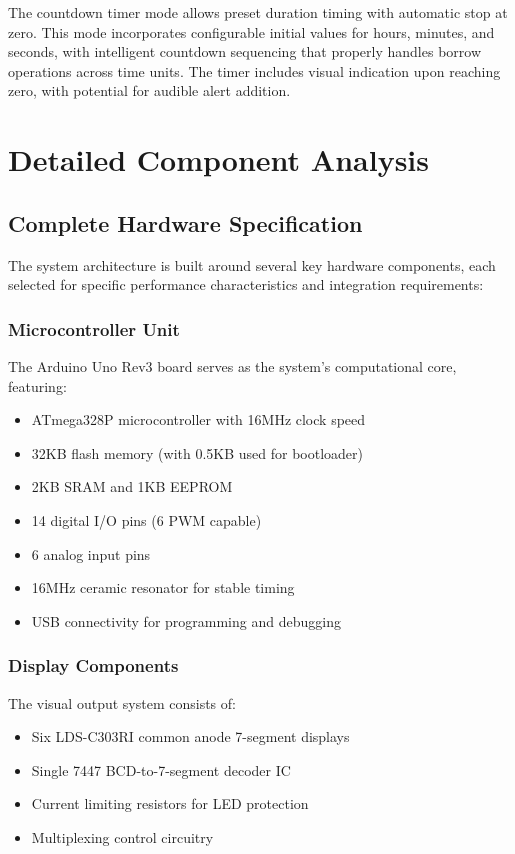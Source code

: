 \documentclass[a4paper,12pt]{article}
\begin{document}
The countdown timer mode allows preset duration timing with automatic stop at zero. This mode incorporates configurable initial values for hours, minutes, and seconds, with intelligent countdown sequencing that properly handles borrow operations across time units. The timer includes visual indication upon reaching zero, with potential for audible alert addition.

\section{Detailed Component Analysis}

\subsection{Complete Hardware Specification}
The system architecture is built around several key hardware components, each selected for specific performance characteristics and integration requirements:

\subsubsection{Microcontroller Unit}
The Arduino Uno Rev3 board serves as the system's computational core, featuring:
\begin{itemize}
    \item ATmega328P microcontroller with 16MHz clock speed
    \item 32KB flash memory (with 0.5KB used for bootloader)
    \item 2KB SRAM and 1KB EEPROM
    \item 14 digital I/O pins (6 PWM capable)
    \item 6 analog input pins
    \item 16MHz ceramic resonator for stable timing
    \item USB connectivity for programming and debugging
\end{itemize}

\subsubsection{Display Components}
The visual output system consists of:
\begin{itemize}
    \item Six LDS-C303RI common anode 7-segment displays
    \item Single 7447 BCD-to-7-segment decoder IC
    \item Current limiting resistors for LED protection
    \item Multiplexing control circuitry
\end{itemize}
\end{document}
